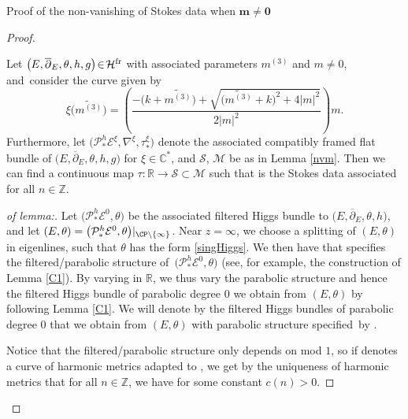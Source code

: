 \begin{subsubsection}{Proof of the non-vanishing of Stokes data when $\boldsymbol{m\neq 0}$}
\begin{proof}
\begin{Lemma} Let $\bigl(\hspace{-0.3pt}E,\overline{\partial}_E,\theta, h, g\bigr)\!\in\! \mathcal{H}^{\textnormal{fr}}$ with associated parameters $m^{(3)}$ and $m\neq 0$, and~\mbox{consi\-der} the curve  given by
\begin{equation*}
 \xi\bigl(\widetilde{m^{(3)}}\bigr)=\left(\frac{-\bigl(k+\widetilde{m^{(3)}}\bigr)+ \sqrt{\bigl(\widetilde{m^{(3)}}+k\bigr)^2+4|m|^2}}{2|m|^2}\right)m.
\end{equation*}
Furthermore, let $\bigl(\mathcal{P}_*^{h}\mathcal{E}^{\xi},\nabla^{\xi},\tau_*^{\xi}\bigr)$ denote the associated compatibly framed flat bundle of $\bigl(E,\overline{\partial}_E,\allowbreak\theta, h, g\bigr)$ for $\xi \in \mathbb{C}^*$, and $\mathcal{S}$, $\mathcal{M}$ be as in Lemma {\rm\ref{nvm}}. Then we can find a continuous map $\tau\colon \mathbb{R} \to \mathcal{S}\subset \mathcal{M}$ such that  is the Stokes data associated  for all $n \in \mathbb{Z}$.

\end{Lemma}

\begin{proof}[of lemma:] Let $\bigl(\mathcal{P}_*^{h}\mathcal{E}^0,\theta\bigr)$ be the associated filtered Higgs bundle to $\bigl(E,\overline{\partial}_E,\theta,h\bigr)$, and let $(E,\theta)=\bigl(\mathcal{P}_*^{h}\mathcal{E}^0,\theta\bigr)|_{\CP \setminus \{\infty\}}$. Near $z=\infty$, we choose a splitting of $(E,\theta)$ in eigenlines, such that $\theta$ has the form \eqref{singHiggs}. We then have that  specifies the filtered/parabolic structure of~$\bigl(\mathcal{P}_*^{h}\mathcal{E}^0,\theta\bigr)$ (see, for example, the construction of Lemma \ref{C1}). By varying  in $\mathbb{R}$, we thus vary the parabolic structure and hence the filtered Higgs bundle of parabolic degree $0$ we obtain from $(E,\theta)$ by following Lemma \ref{C1}. We will denote by  the filtered Higgs bundles of parabolic degree $0$ that we obtain from $(E,\theta)$ with parabolic structure specified~by .

Notice that the filtered/parabolic structure only depends on  mod $1$, so if  denotes a curve of harmonic metrics adapted to , we get by the uniqueness of harmonic metrics that for all $n \in \mathbb{Z}$, we have  for some constant $c(n)>0$.


\end{proof}
\end{proof}
\end{subsubsection}
